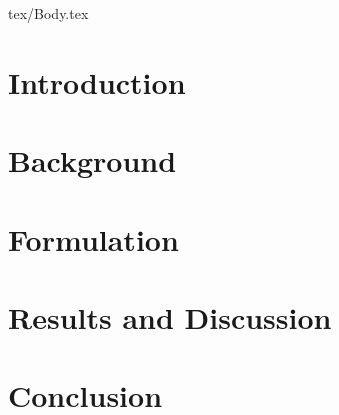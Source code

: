 \documentclass[11pt, twoside, draft]{article}
\begin{document}
\clearpage


\setcounter{tocdepth}{3}

\tableofcontents

\clearpage


%

\printnoidxglossaries

\clearpage

\listoftodos


\cleardoublepage




\ifdraft{

}
{
\begin{multicols}{2}

\end{multicols}
}
\begin{filecontents}{tex/Body.tex}

\section{Introduction}
\label{sec:introduction}


%

\section{Background}
\label{sec:background}


%

\section{Formulation}
\label{sec:formulation}


% 

\clearpage

\section{Results and Discussion}
\label{sec:results}


%

\section{Conclusion}
\label{sec:conclusion}




\end{filecontents}
\end{document}
